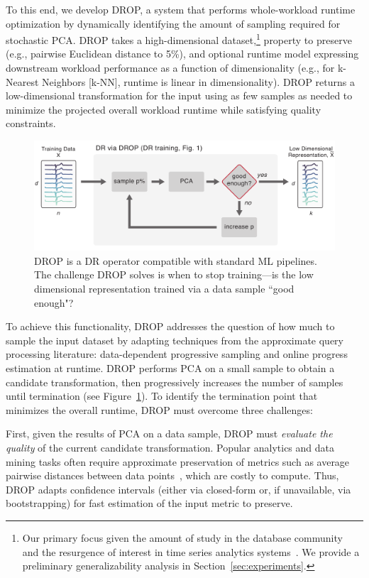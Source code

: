 To this end, we develop DROP, a system that performs whole-workload runtime optimization by dynamically identifying the amount of sampling required for stochastic PCA.
DROP takes a high-dimensional dataset,\footnote{Our primary focus  given the amount of study in the database community~\cite{keogh-study} and the resurgence of interest in time series analytics systems~\cite{macrobase,macrobase-cidr,trill-signal}. We provide a preliminary generalizability analysis in Section~\ref{sec:experiments}.}  property to preserve (e.g., pairwise Euclidean distance to 5\%), and optional runtime model expressing downstream workload performance as a function of dimensionality (e.g., for k-Nearest Neighbors [k-NN], runtime is linear in dimensionality). 
DROP returns a low-dimensional transformation for the input using as few samples as needed to minimize the projected overall workload runtime while satisfying quality constraints.

\begin{figure}
\includegraphics[width=\linewidth]{figs/basic.pdf}
\caption[]{DROP is a DR operator compatible with standard ML pipelines. The challenge DROP solves is when to stop training---is the low dimensional representation trained via a data sample ``good enough"?}
\label{fig:basic}
\end{figure}


To achieve this functionality, DROP addresses the question of how much to sample the input dataset by adapting techniques from the approximate query processing literature: data-dependent progressive sampling and online progress estimation at runtime.  
DROP performs PCA on a small sample to obtain a candidate transformation, then progressively increases the number of samples until termination (see Figure~\ref{fig:basic}). 
To identify the termination point that minimizes the overall runtime, DROP must overcome three challenges:

First, given the results of PCA on a data sample, DROP must \emph{evaluate the quality} of the current candidate transformation.
Popular analytics and data mining tasks often require approximate preservation of metrics such as average pairwise distances between data points~\cite{time-series-dm,dm-book}, which are costly to compute.
Thus, DROP adapts confidence intervals (either via closed-form or, if unavailable, via bootstrapping) for fast estimation of the input metric to preserve.


